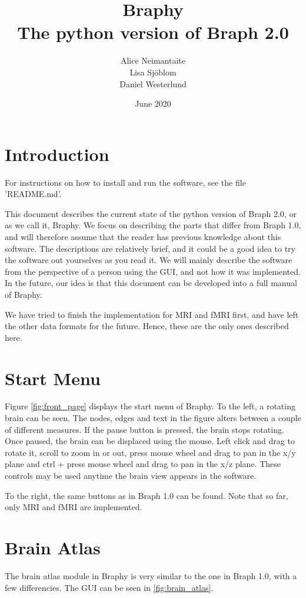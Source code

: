 \documentclass{article}
\title{%
	Braphy \\
	\large The python version of Braph 2.0}
\author{Alice Neimantaite \\ Lisa Sjöblom \\ Daniel Westerlund}
\date{June 2020}
\begin{document}
\maketitle
\clearpage

\section{Introduction}

For instructions on how to install and run the software, see the file 'README.md'.

This document describes the current state of the python version of Braph 2.0, or as we call it, Braphy. We focus on describing the parts that differ from Braph 1.0, and will therefore assume that the reader has previous knowledge about this software. The descriptions are relatively brief, and it could be a good idea to try the software out yourselves as you read it. We will mainly describe the software from the perspective of a person using the GUI, and not how it was implemented. In the future, our idea is that this document can be developed into a full manual of Braphy.

We have tried to finish the implementation for MRI and fMRI first, and have left the other data formats for the future. Hence, these are the only ones described here.

\section{Start Menu}

Figure \ref{fig:front_page} displays the start menu of Braphy. To the left, a rotating brain can be seen. The nodes, edges and text in the figure alters between a couple of different measures. If the pause button is pressed, the brain stops rotating. Once paused, the brain can be displaced using the mouse. Left click and drag to rotate it, scroll to zoom in or out, press mouse wheel and drag to pan in the x/y plane and ctrl + press mouse wheel and drag to pan in the x/z plane. These controls may be used anytime the brain view appears in the software.

To the right, the same buttons as in Braph 1.0 can be found. Note that so far, only MRI and fMRI are implemented. 

\section{Brain Atlas}

The brain atlas module in Braphy is very similar to the one in Braph 1.0, with a few differencies. The GUI can be seen in \cref{fig:brain_atlas}.
\end{document}
